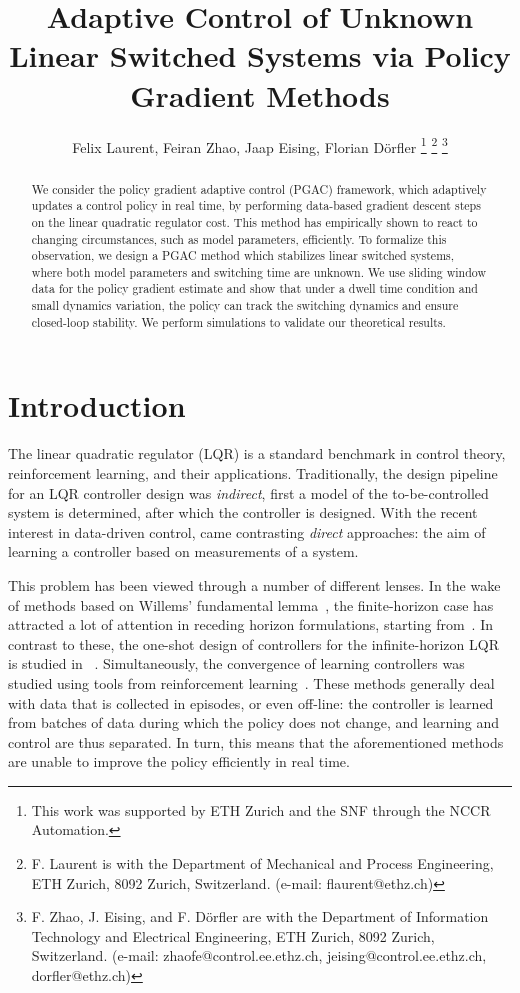 \documentclass[letterpaper, 10 pt, conference]{ieeeconf}  %
\title{\LARGE \bf
Adaptive Control of Unknown Linear Switched Systems via Policy Gradient Methods
}
\author{Felix Laurent, Feiran Zhao, Jaap Eising, Florian D\"{o}rfler %
\thanks{This work was supported by ETH Zurich and the SNF through the NCCR Automation.}
\thanks{F. Laurent is with the Department of Mechanical and Process Engineering, ETH Zurich, 8092 Zurich, Switzerland. (e-mail: flaurent@ethz.ch)}
\thanks{F. Zhao, J. Eising, and F. D\"{o}rfler are with the Department of Information Technology and Electrical Engineering, ETH Zurich, 8092 Zurich, Switzerland. (e-mail: zhaofe@control.ee.ethz.ch, jeising@control.ee.ethz.ch, dorfler@ethz.ch)} %
}
\begin{document}
\maketitle
\thispagestyle{empty}
\pagestyle{empty}
\begin{abstract}
We consider the policy gradient adaptive control (PGAC) framework, which adaptively updates a control policy in real time, by performing data-based gradient descent steps on the linear quadratic regulator cost. This method has empirically shown to react to changing circumstances, such as model parameters, efficiently. To formalize this observation, we design a PGAC method which stabilizes linear switched systems, where both model parameters and switching time are unknown. We use sliding window data for the policy gradient estimate and show that under a dwell time condition and small dynamics variation, the policy can track the switching dynamics and ensure closed-loop stability. We perform simulations to validate our theoretical results.
\end{abstract}
 

\section{Introduction}
 

The linear quadratic regulator (LQR) is a standard benchmark in control theory, reinforcement learning, and their applications. Traditionally, the design pipeline for an LQR controller design was \textit{indirect}, first a model of the to-be-controlled system is determined, after which the controller is designed. With the recent interest in data-driven control, came contrasting \textit{direct} approaches: the aim of learning a controller based on measurements of a system. 

This problem has been viewed through a number of different lenses. In the wake of methods based on Willems' fundamental lemma~\cite{willems2005note}, the finite-horizon case has attracted a lot of attention in receding horizon formulations, starting from~\cite{coulson2019data,berberich2020data}. In contrast to these, the one-shot design of controllers for the infinite-horizon LQR is studied in ~\cite{de2019formulas,van2020data}. 
Simultaneously, the convergence of learning controllers was studied using tools from reinforcement learning~\cite{fazel2018global,mohammadi2022convergence,tsiamis2023statistical}. 
These methods generally deal with data that is collected in episodes, or even off-line: the controller is learned from batches of data during which the policy does not change, and learning and control are thus separated. In turn, this means that the aforementioned methods are unable to improve the policy efficiently in real time. 
\end{document}
